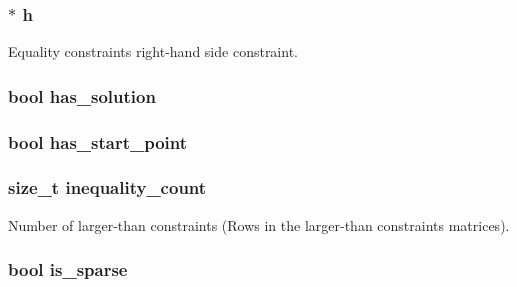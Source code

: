 \subsubsection[{h}]{$\ast$ h}\label{structproblem_a8e142e0ead965e30c731cac0c81f0546}
Equality constraints right-\/hand side constraint. \hypertarget{structproblem_af593a3f5fcf12e8513374bc6475a53d4}{}
\subsubsection[{has\+\_\+solution}]{\setlength{\rightskip}{0pt plus 5cm}bool has\+\_\+solution}\label{structproblem_af593a3f5fcf12e8513374bc6475a53d4}
\hypertarget{structproblem_a2596cd297f65ddbda474ea881a09a9e9}{}
\subsubsection[{has\+\_\+start\+\_\+point}]{\setlength{\rightskip}{0pt plus 5cm}bool has\+\_\+start\+\_\+point}\label{structproblem_a2596cd297f65ddbda474ea881a09a9e9}
\hypertarget{structproblem_a029a32146b466096a85a0573992327fa}{}
\subsubsection[{inequality\+\_\+count}]{\setlength{\rightskip}{0pt plus 5cm}size\+\_\+t inequality\+\_\+count}\label{structproblem_a029a32146b466096a85a0573992327fa}
Number of larger-\/than constraints (Rows in the larger-\/than constraints matrices). \hypertarget{structproblem_ab67d0346971f5ea4c8c700e4177048ca}{}
\subsubsection[{is\+\_\+sparse}]{\setlength{\rightskip}{0pt plus 5cm}bool is\+\_\+sparse}\label{structproblem_ab67d0346971f5ea4c8c700e4177048ca}
\hypertarget{structproblem_a988084bf1423637718de8882244149f4}{}
